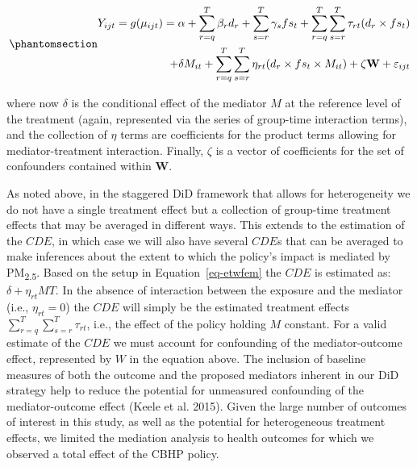 \documentclass[
  letterpaper,
  DIV=11,
  numbers=noendperiod]{scrartcl}
\providecommand{\DIFaddbegin}{} %
\providecommand{\DIFaddend}{} %
\providecommand{\DIFdelbegin}{} %
\providecommand{\DIFdelend}{} %
\newcommand{\DIFscaledelfig}{0.5}
\newlength{\DIFdelgraphicswidth} %
\newlength{\DIFdelgraphicsheight} %
\newcommand{\DIFaddincludegraphics}[2][]{{\color{blue}\fbox{\DIFOincludegraphics[#1]{#2}}}} %
\newcommand{\DIFdelincludegraphics}[2][]{%
\sbox{\DIFdelgraphicsbox}{\DIFOincludegraphics[#1]{#2}}%
\settoboxwidth{\DIFdelgraphicswidth}{\DIFdelgraphicsbox} %
\settoboxtotalheight{\DIFdelgraphicsheight}{\DIFdelgraphicsbox} %
\scalebox{\DIFscaledelfig}{%
\parbox[b]{\DIFdelgraphicswidth}{\usebox{\DIFdelgraphicsbox}\\[-\baselineskip] \rule{\DIFdelgraphicswidth}{0em}}\llap{\resizebox{\DIFdelgraphicswidth}{\DIFdelgraphicsheight}{%
\setlength{\unitlength}{\DIFdelgraphicswidth}%
\begin{picture}(1,1)%
\thicklines\linethickness{2pt} %
{\color[rgb]{1,0,0}\put(0,0){\framebox(1,1){}}}%
{\color[rgb]{1,0,0}\put(0,0){\line( 1,1){1}}}%
{\color[rgb]{1,0,0}\put(0,1){\line(1,-1){1}}}%
\end{picture}%
}\hspace*{3pt}}} %
} %
\DeclareRobustCommand{\DIFaddbegin}{\DIFOaddbegin \let\includegraphics\DIFaddincludegraphics} %
\DeclareRobustCommand{\DIFaddend}{\DIFOaddend \let\includegraphics\DIFOincludegraphics} %
\DeclareRobustCommand{\DIFdelbegin}{\DIFOdelbegin \let\includegraphics\DIFdelincludegraphics} %
\DeclareRobustCommand{\DIFdelend}{\DIFOaddend \let\includegraphics\DIFOincludegraphics} %
\begin{document}
\begin{equation}\DIFdelbegin %
\DIFdelend \DIFaddbegin \phantomsection\label{eq-etwfem}{
\begin{aligned}
Y_{ijt}=g(\mu_{ijt}) = \alpha + \sum_{r=q}^{T} \beta_{r} d_{r} + \sum_{s=r}^{T} \gamma_{s} fs_{t}+ \sum_{r=q}^{T} \sum_{s=r}^{T} \tau_{rt} (d_{r} \times fs_{t}) \\ + \delta M_{it} + \sum_{r=q}^{T} \sum_{s=r}^{T} \eta_{rt} (d_{r} \times fs_{t} \times M_{it}) + \zeta \mathbf{W} + \varepsilon_{ijt}
\end{aligned}
}\DIFaddend \end{equation}

where now \(\delta\) is the conditional effect of the mediator \(M\) at
the reference level of the treatment (again, represented via the series
of group-time interaction terms), and the collection of \(\eta\) terms
are coefficients for the product terms allowing for mediator-treatment
interaction. Finally, \(\zeta\) is a vector of coefficients for the set
of confounders contained within \(\mathbf{W}\).

As noted above, in the staggered DiD framework that allows for
heterogeneity we do not have a single treatment effect but a collection
of group-time treatment effects that may be averaged in different ways.
This extends to the estimation of the \(CDE\), in which case we will
also have several \(CDE\)s that can be averaged to make inferences about
the extent to which the policy's impact is mediated by
PM\textsubscript{2.5}. Based on the setup in Equation~\ref{eq-etwfem}
the \(CDE\) is estimated as: \(\delta + \eta_{rt}MT\). In the absence of
interaction between the exposure and the mediator (i.e.,
\(\eta_{rt}=0\)) the \(CDE\) will simply be the estimated treatment
effects \(\sum_{r=q}^{T} \sum_{s=r}^{T} \tau_{rt}\), i.e., the effect of
the policy holding \(M\) constant. For a valid estimate of the \(CDE\)
we must account for confounding of the mediator-outcome effect,
represented by \(W\) in the equation above. The inclusion of baseline
measures of both the outcome and the proposed mediators inherent in our
DiD strategy help to reduce the potential for unmeasured confounding of
the mediator-outcome effect (Keele et al. 2015). Given the large number
of outcomes of interest in this study, as well as the potential for
heterogeneous treatment effects, we limited the mediation analysis to
health outcomes for which we observed a total effect of the CBHP policy.
\end{document}
